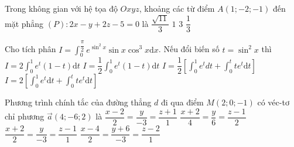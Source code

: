 \begin{ex}%
Trong không gian với hệ tọa độ $Oxyz$, khoảng các từ điểm $A(1; -2; -1)$ đến mặt phẳng $(P): 2x - y + 2z - 5 = 0$ là
\choice
{$\dfrac{\sqrt{11}}{3}$}
{\True $1$}
{$3$}
{$\dfrac{1}{3}$}
\end{ex}




\begin{ex}%
Cho tích phân $\displaystyle I = \int_0^{\dfrac{\pi}{2}} e^{\sin ^2 x} \sin x \cos ^3 x \mathrm{d}x$. Nếu đổi biến số $t = \sin^2 x$ thì 
\choice
{$\displaystyle I = 2\int_0^1 e^t \left(1-t\right)\mathrm{d}t$}
{\True $\displaystyle I = \dfrac{1}{2}\int_0^1 e^t \left(1- t\right)\mathrm{d}t$}
{$\displaystyle I = \dfrac{1}{2}\left[ \int_0^1 e^t dt + \int_0^t te^t \mathrm{d}t\right] $}
{$\displaystyle I = 2\left[ \int_0^1 e^t \mathrm{d}t + \int_0^t te^t \mathrm{d}t\right] $}
\end{ex}




\begin{ex}%
Phương trình chính tắc của đường thẳng $d$ đi qua điểm $M(2; 0; -1)$ có véc-tơ chỉ phương $\overrightarrow{a} (4; -6; 2)$ là
\choice
{\True $\dfrac{x - 2}{2} = \dfrac{y}{-3} = \dfrac{z + 1}{1}$}
{$\dfrac{x + 2}{4} = \dfrac{y}{6} = \dfrac{z - 1}{2}$}
{$\dfrac{x + 2}{2} = \dfrac{y}{-3} = \dfrac{z - 1}{1}$}
{$\dfrac{x - 4}{2} = \dfrac{y + 6}{-3} = \dfrac{z - 2}{1}$}
\end{ex}



